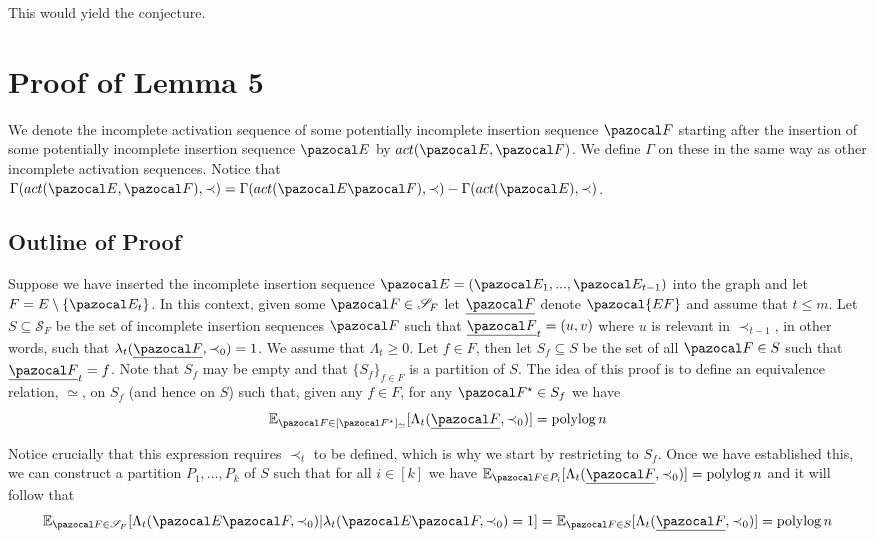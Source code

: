 \documentclass{article}
\DeclareMathOperator*{\polylog}{polylog}
\begin{document}
This would yield the conjecture.

\section{Proof of Lemma 5}

We denote the incomplete activation sequence of some potentially incomplete insertion sequence $\pazocal F$ starting after the insertion of some potentially incomplete insertion sequence $\pazocal E$ by $act(\pazocal E, \pazocal F)$. We define $\Gamma$ on these in the same way as other incomplete activation sequences. Notice that $\Gamma(act(\pazocal E, \pazocal F), \prec) = \Gamma(act(\pazocal E\pazocal F), \prec) - \Gamma(act(\pazocal E), \prec)$.

\subsection{Outline of Proof}

Suppose we have inserted the incomplete insertion sequence $\pazocal E = (\pazocal E_1,...,\pazocal E_{t-1})$ into the graph and let $F=E \setminus \{\pazocal E_t\}$. In this context, given some $\pazocal F \in \mathcal S_F$ let $\underline{\pazocal F}$ denote $\pazocal{EF}$ and assume that $t \leq m$. Let $S \subseteq \mathcal S_F$ be the set of incomplete insertion sequences $\pazocal F$ such that $\underline{\pazocal F}_t=(u,v)$ where $u$ is relevant in $\prec_{t-1}$, in other words, such that $\lambda_t(\underline{\pazocal F}, \prec_0)=1$. We assume that $\Lambda_t \geq 0$. Let $f \in F$, then let $S_f \subseteq S$ be the set of all $\pazocal F \in S$ such that $\underline{\pazocal F}_t = f$. Note that $S_f$ may be empty and that $\{ S_f \}_{f \in F}$ is a partition of $S$. The idea of this proof is to define an equivalence relation, $\simeq$, on $S_f$ (and hence on $S$) such that, given any $f \in F$, for any $\pazocal F^\star \in S_f$ we have
\[ \mathbb E_{\pazocal F \in [\pazocal F^\star]_{\simeq}}[\Lambda_t(\underline{\pazocal F}, \prec_0)] = \polylog n \]

Notice crucially that this expression requires $\prec_t$ to be defined, which is why we start by restricting to $S_f$. Once we have established this, we can construct a partition $P_1,...,P_k$ of $S$ such that for all $i \in [k]$ we have $\mathbb E_{\pazocal F \in P_i}[\Lambda_t(\underline{\pazocal F}, \prec_0)] = \polylog n$ and it will follow that
\[ \mathbb E_{\pazocal F \in \mathcal S_F} [\Lambda_t(\pazocal E \pazocal F, \prec_0) \vert \lambda_t(\pazocal E \pazocal F, \prec_0) = 1] = \mathbb E_{\pazocal F \in S} [\Lambda_t(\underline{\pazocal F}, \prec_0)]= \polylog n \]
\end{document}

